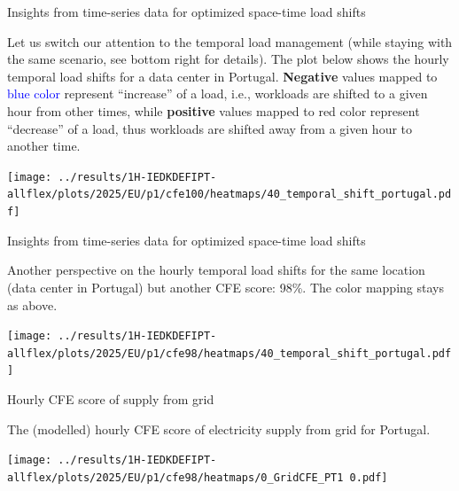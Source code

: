 \begin{frame}{Insights from time-series data for optimized space-time load shifts}

  {\footnotesize

  Let us switch our attention to the temporal load management (while staying with the same scenario, see bottom right for details). The plot below shows the \alert{hourly temporal load shifts} for a data center in Portugal. {\bf Negative} values mapped to \textcolor{blue}{blue color} represent \enquote{increase} of a load, i.e., workloads are shifted to a given hour from other times, while {\bf positive} values mapped to \textcolor{TUred}{red color} represent \enquote{decrease} of a load, thus workloads are shifted away from a given hour to another time. 

  \vspace{0.1cm}
  \texttt{[image: ../results/1H-IEDKDEFIPT-allflex/plots/2025/EU/p1/cfe100/heatmaps/40\_temporal\_shift\_portugal.pdf]}
  }

\end{frame}


\begin{frame}{Insights from time-series data for optimized space-time load shifts}

  {\footnotesize

  Another perspective on the \alert{hourly temporal load shifts} for the same location (data center in Portugal) but another CFE score: 98\%. The color mapping stays as above.

  \vspace{0.3cm}
  \texttt{[image: ../results/1H-IEDKDEFIPT-allflex/plots/2025/EU/p1/cfe98/heatmaps/40\_temporal\_shift\_portugal.pdf]}
  }
  
\end{frame}

\begin{frame}{Hourly CFE score of supply from grid}

  {\footnotesize
  The (modelled) \alert{hourly CFE score of electricity supply from grid} for Portugal. 

  \vspace{.3cm}
  \texttt{[image: ../results/1H-IEDKDEFIPT-allflex/plots/2025/EU/p1/cfe98/heatmaps/0\_GridCFE\_PT1 0.pdf]}
  }
\end{frame}


